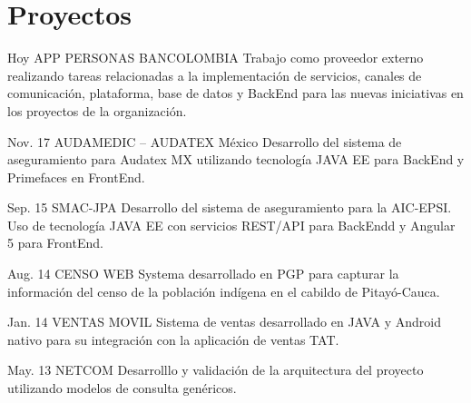 \documentclass[]{cv-class}
\begin{document}
\section{Proyectos}
\begin{entrylist}
	\entry
	{Hoy}
	{APP PERSONAS BANCOLOMBIA}
	{ }
	{Trabajo como proveedor externo realizando tareas relacionadas a la implementación de servicios, canales de comunicación, plataforma, base de datos y BackEnd para las nuevas iniciativas en los proyectos de la organización.}
	
	\entry
	{Nov. 17}
	{AUDAMEDIC – AUDATEX México}
	{ }
	{Desarrollo del sistema de aseguramiento para Audatex MX utilizando tecnología JAVA EE para BackEnd y Primefaces en FrontEnd.}
	  
	\entry
	{Sep. 15}
	{SMAC-JPA}
	{ }
	{Desarrollo del sistema de aseguramiento para la AIC-EPSI. Uso de tecnología JAVA EE con servicios REST/API para BackEndd y Angular 5 para FrontEnd.}
	
	\entry
	{Aug. 14}
	{CENSO WEB}
	{ }
	{Systema desarrollado en PGP para capturar la información del censo de la población indígena en el cabildo de Pitayó-Cauca.}
	
	\entry
	{Jan. 14}
	{VENTAS MOVIL}
	{ }
	{Sistema de ventas desarrollado en JAVA y Android nativo para su integración con la aplicación de ventas TAT.}
	
	\entry
	{May. 13}
	{NETCOM}
	{ }
	{Desarrolllo y validación de la arquitectura del proyecto utilizando modelos de consulta genéricos.}
	
\end{entrylist}
\end{document}
